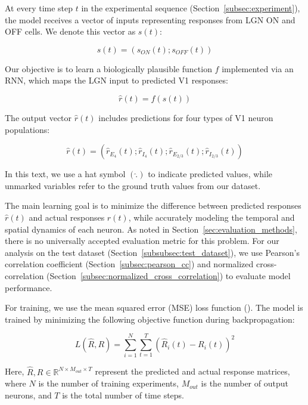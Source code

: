 At every time step $t$ in the experimental sequence (Section~\ref{subsec:experiment}), the model receives a vector of inputs representing responses from LGN ON and OFF cells. We denote this vector as $s(t)$:

\begin{equation*}
    s(t) = \left(s_{ON}(t); s_{OFF}(t)\right)
\end{equation*}

Our objective is to learn a biologically plausible function $f$ implemented via an RNN, which maps the LGN input to predicted V1 responses:

\begin{equation*}
    \hat{r}(t) = f(s(t))
\end{equation*}

The output vector $\hat{r}(t)$ includes predictions for four types of V1 neuron populations:

\begin{equation*}
    \hat{r}(t) = \left(\hat{r}_{E_4}(t); \hat{r}_{I_4}(t); \hat{r}_{E_{2/3}}(t); \hat{r}_{I_{2/3}}(t)\right)
\end{equation*}

In this text, we use a hat symbol $(\hat{.})$ to indicate predicted values, while unmarked variables refer to the ground truth values from our dataset.

The main learning goal is to minimize the difference between predicted responses $\hat{r}(t)$ and actual responses $r(t)$, while accurately modeling the temporal and spatial dynamics of each neuron. As noted in Section~\ref{sec:evaluation_methods}, there is no universally accepted evaluation metric for this problem. For our analysis on the test dataset (Section~\ref{subsubsec:test_dataset}), we use Pearson's correlation coefficient (Section~\ref{subsec:pearson_cc}) and normalized cross-correlation (Section~\ref{subsec:normalized_cross_correlation}) to evaluate model performance.

For training, we use the mean squared error (MSE) loss function (\citet{alpaydin2020introduction}). The model is trained by minimizing the following objective function during backpropagation:

\begin{equation*}
    L(\hat{R}, R) = \sum_{i=1}^{N}\sum_{t=1}^{T}\left(\hat{R}_i(t) - R_i(t)\right)^2
\end{equation*}

Here, $\hat{R}, R \in \mathbb{R}^{N \times M_{out} \times T}$ represent the predicted and actual response matrices, where $N$ is the number of training experiments, $M_{out}$ is the number of output neurons, and $T$ is the total number of time steps.

